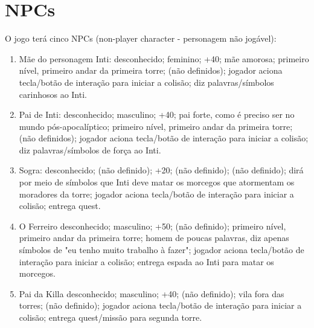 \documentclass[12pt]{article}
\begin{document}
\section{NPCs}
O jogo terá cinco NPCs (non-player character - personagem não jogável):
\begin{enumerate}
\item Mãe do personagem Inti:
 desconhecido;
 feminino;
 +40;
 mãe amorosa;
 primeiro nível, primeiro andar da
primeira torre;
 (não definidos);
 jogador aciona tecla/botão de interação para iniciar a
colisão;
 diz palavras/símbolos carinhosos ao Inti.

\item Pai de Inti:
 desconhecido;
 masculino;
 +40;
 pai forte, como é preciso ser no mundo
pós-apocalíptico;
 primeiro nível, primeiro andar da
primeira torre;
 (não definidos);
 jogador aciona tecla/botão de interação para iniciar a
colisão;
 diz palavras/símbolos de força ao Inti.

\item Sogra:
 desconhecido;
 (não definido);
 +20;
 (não definido);
 (não definido);
 dirá por meio de símbolos que Inti deve matar os
morcegos que atormentam os moradores da torre;
 jogador aciona tecla/botão de interação para iniciar a
colisão;
 entrega quest.

\item O Ferreiro
 desconhecido;
 masculino;
 +50;
 (não definido);
 primeiro nível, primeiro andar da
primeira torre;
 homem de poucas palavras, diz apenas símbolos de "eu
tenho muito trabalho à fazer";
 jogador aciona tecla/botão de interação para iniciar a
colisão;
 entrega espada ao Inti para matar os morcegos.

\item Pai da Killa
 desconhecido;
 masculino;
 +40;
 (não definido);
 vila fora das torres;
 (não definido);
 jogador aciona tecla/botão de interação para iniciar a
colisão;
 entrega quest/missão para segunda torre.
\end{enumerate}
\end{document}
